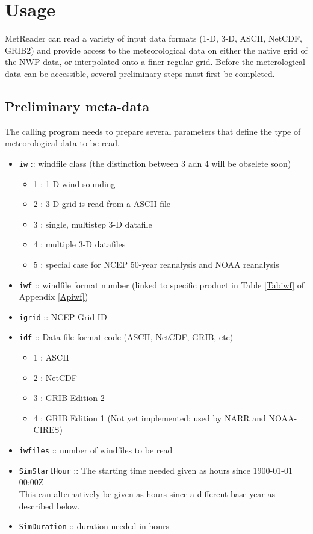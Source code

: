 \documentclass[11pt]{article}   %
\begin{document}
\clearpage
\section{Usage}
MetReader can read a variety of input data formats (1-D, 3-D, ASCII, NetCDF, GRIB2) and
provide access to the meteorological data on either the native grid of the NWP data, or interpolated
onto a finer regular grid.  Before the meterological data can be accessible, several preliminary steps
must first be completed.
\subsection{Preliminary meta-data}\label{SSecPrelimMetaData}
The calling program needs to prepare several parameters that define the type of meteorological
data to be read.  
\begin{itemize}
\item \texttt{iw} :: windfile class (the distinction between 3 adn 4 will be obselete soon)
 \begin{itemize}
 \item 1 : 1-D wind sounding
 \item 2 : 3-D grid is read from a ASCII file
 \item 3 : single, multistep 3-D datafile
 \item 4 : multiple 3-D datafiles
 \item 5 : special case for NCEP 50-year reanalysis and NOAA reanalysis
 \end{itemize}
\item \texttt{iwf} :: windfile format number (linked to specific product in Table
  \ref{Tabiwf} of Appendix \ref{Apiwf})
\item \texttt{igrid} :: NCEP Grid ID
\item \texttt{idf} :: Data file format code (ASCII, NetCDF, GRIB, etc)
 \begin{itemize}
 \item   1 : ASCII
 \item   2 : NetCDF
 \item   3 : GRIB Edition 2
 \item   4 : GRIB Edition 1 (Not yet implemented; used by NARR and NOAA-CIRES)
 \end{itemize}
\item \texttt{iwfiles} :: number of windfiles to be read
\item \texttt{SimStartHour} ::  The starting time needed given as hours since 1900-01-01 00:00Z\\
This can alternatively be given as hours since a different base year as described below.
\item \texttt{SimDuration} ::  duration needed in hours
\end{itemize}
\end{document}
